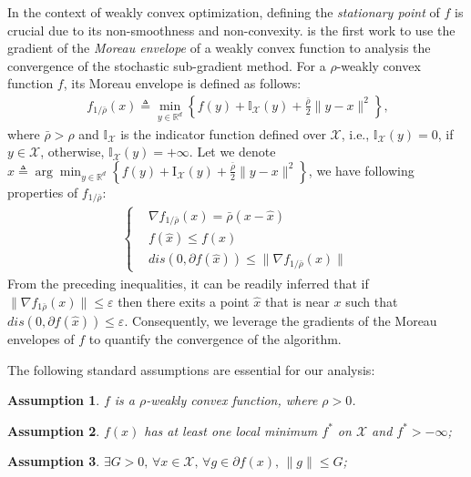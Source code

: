 \documentclass{article}
\newtheorem{assumption}{Assumption}[section]
\def \X {\mathcal{X}}
\def \R {\mathbb{R}}
\begin{document}
In the context of weakly convex optimization, defining the \textit{stationary point} of $f$
 is crucial due to its non-smoothness and non-convexity. \citep{Davis_2018} is the first work to use the gradient of the \textit{Moreau envelope} of a weakly convex function to analysis the convergence of the stochastic sub-gradient method. For a $\rho$-weakly convex function $f$, its Moreau envelope is defined as follows:
 \begin{align}~\label{eq: fun_moreau_envelope}
     f_{1/\bar{\rho}}(x) \triangleq \min_{y\in\R^d}\left\{f(y)+\mathbb{I}_\X(y)+\frac{\bar{\rho}}{2}\|y-x\|^2\right\},
 \end{align}
 where $\bar{\rho}>\rho$ and $\mathbb{I}_\X$ is the indicator function defined over $\X$, i.e., $\mathbb{I}_\X(y)=0$, if $y\in\X$, otherwise, $\mathbb{I}_\X(y)=+\infty$. Let we denote $\hat{x}\triangleq\arg\min_{y\in\R^d}\left\{f(y)+\textrm{I}_\X(y)+\frac{\bar{\rho}}{2}\|y-x\|^2\right\}$, we have following properties of $f_{1/\bar{\rho}}$:
 \begin{align*}
     \begin{cases}
         &\nabla f_{1/\bar{\rho}}(x) = \bar{\rho}(x-\hat{x})\\
         &f(\hat{x})\leq f(x)\\
         &dis(0,\partial f(\hat{x}))\leq \|\nabla f_{1/\bar{\rho}}(x)\|
     \end{cases}
 \end{align*}
 From the preceding inequalities, it can be readily inferred that if $\|\nabla f_{1\bar{\rho}}(x)\|\leq \varepsilon$ then there exits a point $\hat{x}$ that is near $x$ such that $dis(0,\partial f(\hat{x}))\leq\varepsilon$. Consequently, we leverage the gradients of the Moreau envelopes of $f$ to quantify the convergence of the algorithm.

 The following standard assumptions are essential for our analysis:
 \begin{assumption}\label{assp:weak_conv}
     $f$ is a $\rho$-weakly convex function, where $\rho>0$.
 \end{assumption}
 \begin{assumption}\label{assp:lower_bound}
     $f(x)$ has at least one local minimum $f^*$ on $\mathcal{X}$ and $f^*> -\infty$;
 \end{assumption}

 \begin{assumption}\label{assp:G_Lipsch}
     $\exists G>0,\, \forall x\in\mathcal{X},\,\forall g\in\partial f(x),\, \|g\|\leq G$;
 \end{assumption}
\end{document}
